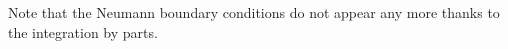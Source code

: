 \documentclass[twocolumn,10pt]{asme2ej}
\begin{document}
Note that the Neumann boundary conditions do not appear any more thanks to the integration by parts.















\end{document}
